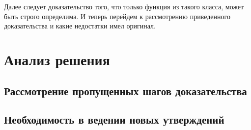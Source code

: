 \documentclass[times,specification,annotation]{itmo-student-thesis}
\begin{document}
Далее следует доказательство того, что только функция из такого класса,
может быть строго определима. И теперь перейдем к рассмотрению приведенного
доказательства и какие недостатки имел оригинал.  


\todo
\section{Анализ решения}
\todo
\subsection{Рассмотрение пропущенных шагов доказательства}
\todo
\subsection{Необходимость в ведении новых утверждений}
\todo

\chapterconclusion


\startrelatedwork
\finishrelatedwork



\end{document}
